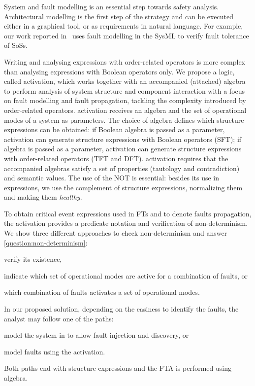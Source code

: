 System and fault modelling is an essential step towards safety analysis.
Architectural modelling is the first step of the strategy and can be executed either in a graphical tool, or as requirements in natural language.
For example, our work reported in~\cite{APR+2013,ADP+2013} uses fault modelling in the \ac{SysML} to verify fault tolerance of \acp{SoS}.

Writing and analysing expressions with order-related operators is more complex than analysing expressions with Boolean operators only.
We propose a logic, called \ac{activation}, which works together with an accompanied (attached) algebra to perform analysis of system structure and component interaction with a focus on fault modelling and fault propagation, tackling the complexity introduced by order-related operators.
\ac{activation} receives an algebra and the set of operational modes of a system as parameters.
The choice of algebra defines which structure expressions can be obtained: if Boolean algebra is passed as a parameter, \ac{activation} can generate structure expressions with Boolean operators (\ac{SFT}); if \ac{algebra} is passed as a parameter, \ac{activation} can generate structure expressions with order-related operators (\ac{TFT} and \ac{DFT}).
\Ac{activation} requires that the accompanied algebras satisfy a set of properties (tautology and contradiction) and semantic values.
The use of the \ac{NOT} is essential: besides its use in expressions, we use the complement of structure expressions, normalizing them and making them \emph{healthy}.

To obtain critical event expressions used in \acp{FT} and to denote faults propagation, the \ac{activation} provides a predicate notation and verification of non-determinism. 
We show three different approaches to check non-determinism and answer \cref{question:non-determinism}: 
\begin{alineasinline}
  \item verify its existence, 
  \item indicate which set of operational modes are active for a combination of faults, or 
  \item which combination of faults activates a set of operational modes.
\end{alineasinline}

In our proposed solution, depending on the easiness to identify the faults, the analyst may follow one of the paths: 
\begin{alineasinline}
  \item model the system in \simulink to allow fault injection and discovery, or 
  \item model faults using the \acl{activation}.
\end{alineasinline}
%
Both paths end with structure expressions and the \ac{FTA} is performed using \ac{algebra}.

